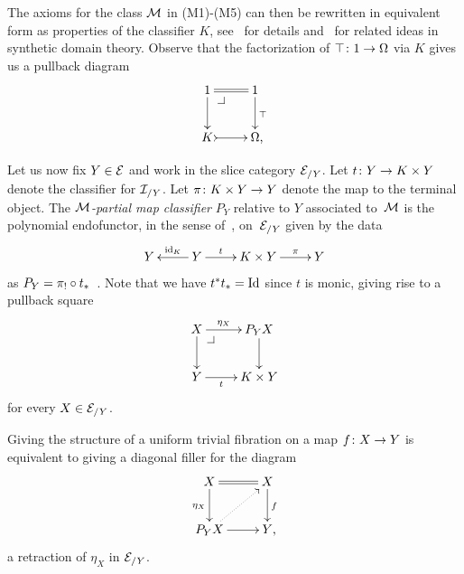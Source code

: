 \documentclass[reqno,10pt,a4paper,oneside,draft]{amsart}
\begin{document}
{{The axioms for the class $\cal{M}$ in (M1)-(M5) can then be rewritten in equivalent form as properties of the classifier $K$, see~\cite{PittsAM:aximct} for details and~\cite{HylandM:firssd,RosoliniG:phd} for related ideas in synthetic domain
theory.
Observe that the factorization of $\top \co 1 \to \Omega$ via $K$ gives us a pullback diagram
\begin{equation} \label{partial-map-classifier:0}
\begin{gathered}
\xymatrix{
  1
  \ar@{=}[r]
  \ar[d]
  \pullback{dr}
&
  1
  \ar[d]^{\top}
\\
  K
  \ar@{>->}[r]
&
  \Omega \rlap{,}
}
\end{gathered}
\end{equation}

Let us now fix $Y \in \cal{E}$ and work in the slice category $\cal{E}_{/Y}$.
Let $t \co Y \to K \times Y$ denote the classifier for $\cal{I}_{/Y}$.
Let $\pi \co K \times Y \to Y$ denote the map to the terminal object.
The \emph{$\cal{M}$-partial map classifier} $P_Y$ relative to $Y$ associated to~$\cal{M}$ is the polynomial endofunctor, in the sense of~\cite{gambino-kock}, on~$\cal{E}_{/Y}$ given by the data
\[
\xymatrix{
  Y
&
  Y
  \ar[l]_-{\id_K}
  \ar[r]^-{t}
&
  K \times Y
  \ar[r]^-{\pi}
&
  Y
}
\]
as $P_Y = \pi_! \cc t_*$~\cite[A2.4]{johnstone:elephant}.
Note that we have $t^* t_* = \Id$ since $t$ is monic, giving rise to a pullback square
\begin{equation} \label{partial-map-classifier:1}
\begin{gathered}
\xymatrix{
  X
  \ar[r]^-{\eta_X}
  \ar[d]
  \pullback{dr}
&
  P_Y X
  \ar[d]
\\
  Y
  \ar[r]_-{t}
&
  K \times Y
}
\end{gathered}
\end{equation}
for every $X \in \cal{E}_{/Y}$.

\begin{theorem} \label{thm:part-map-character}
Giving the structure of a uniform trivial fibration on a map $f \co X \to Y$ is equivalent to giving a diagonal filler for the diagram
\begin{equation*}
\begin{gathered}
\xymatrix{
  X
  \ar@{=}[r]
  \ar[d]_{\eta_X}
&
  X
  \ar[d]^{f}
\\
  P_Y X
  \ar[r]
  \ar@{.>}[ur]
&
  Y
\rlap{,}}
\end{gathered}
\end{equation*}
\ie a retraction of $\eta_X$ in $\cal{E}_{/Y}$.
\end{theorem}

}}
\end{document}
